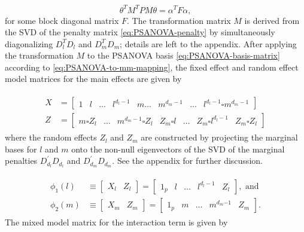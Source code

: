 \documentclass[12pt]{article}
\newcommand{\ms}{\scriptscriptstyle}
\theoremstyle{definition}
\begin{document}
\begin{equation*}
\theta^T M^T P M \theta = \alpha^T F \alpha,
\end{equation*}
\noindent
for some block diagonal matrix $F$.  The transformation matrix $M$ is derived from the SVD of the penalty matrix \ref{eq:PSANOVA-penalty} by simultaneously diagonalizing $D_l^T D_l$ and $D_m^T D_m$; details are left to the appendix. After applying the transformation $M$ to the PSANOVA basis \ref{eq:PSANOVA-basis-matrix} according to \ref{eq:PSANOVA-to-mm-mapping}, the fixed effect and random effect model matrices for the main effects are given by 


\begin{align} 
\begin{split} \label{eq:PSANOVA-fixed-random-effect-matrices}
X &= \left[ \begin{array}{c|c|c|c|c|c|c|c|c} 1 & l  & \dots & l^{\ms d_{\ms l}-1}& m \dots & m^{\ms d_{\ms m}-1} & \dots &  l^{\ms d_{\ms l}-1} \square m^{\ms d_{\ms m}-1} \end{array} \right] \\
Z &= \left[ \begin{array}{c|c|c|c|c|c|c} m \square Z_l & \dots &  m^{\ms d_{\ms m}-1} \square Z_l & Z_m \square l & \dots & Z_m \square  l^{\ms d_{\ms l}-1} & Z_m \square Z_l \end{array} \right]
\end{split}
\end{align}
\noindent 
where the random effects $Z_l$ and $Z_m$ are constructed by projecting the marginal bases for $l$ and $m$ onto the non-null eigenvectors of the SVD of the marginal penalties $D_{\ms d_{\ms l}}^\prime D_{\ms d_{\ms l}}$ and $D_{\ms d_{\ms m}}^\prime D_{\ms d_{\ms m}}$. See the appendix for further discussion. 


\begin{align}
\begin{split} \label{eq:PSANOVA-mm-marginal-matrices}
\phi_1\left(l\right) &\equiv \left[ \begin{array}{c|c} X_l & Z_l \end{array} \right] 	= \left[ \begin{array}{c|c|c|c|c} 1_p & l   &\dots & l^{\ms d_{\ms l} -1}     & Z_l \end{array} \right], \mbox{ and} \\
\phi_2\left(m\right) &\equiv \left[ \begin{array}{c|c} X_m & Z_m \end{array} \right]  =\left[ \begin{array}{c|c|c|c|c} 1_p & m &\dots & m^{\ms d_{\ms m} \ms{- 1 }} & Z_m \end{array} \right].
\end{split}
\end{align}
\noindent
The mixed model matrix for the interaction term is given by 
 
\end{document}
